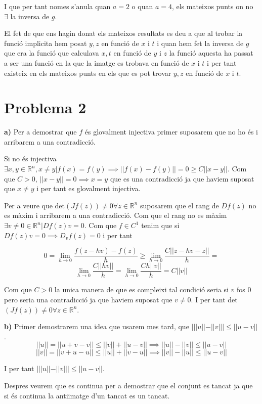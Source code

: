 \documentclass[12pt, a4papre]{article}
\begin{document}
	I que per tant nomes s'anula quan $a=2$ o quan $a=4$, els mateixos punts on no $\exists$ la inversa de $g$.
	
	El fet de que ens hagin donat els mateixos resultats es deu a que al trobar la funció implicita hem posat $y,z$ en funció de $x$ i $t$
	i quan hem fet la inversa de $g$ que era la funció que calculava $x,t$ en funció de $y$ i $z$ la funció aquesta ha passat a ser una funció 
	en la que la imatge es trobava en funció de $x$ i $t$ i per tant existeix en els mateixos punts en els que es pot trovar 
	$y,z$ en funció de $x$ i $t$.
	
	
	\newpage
	\section{Problema 2}
	
	\textbf{a)} Per a demostrar que $f$ és glovalment injectiva primer suposarem que no ho és i arribarem a una contradicció. 
	
	Si no
	és injectiva $\exists x,y \in \mathbb{R}^n, x\ne y | f(x)=f(y) \implies ||f(x)-f(y)||=0\ge C||x-y||$. Com que $C>0$, $||x-y||=0 \implies x=y$ que es
	una contradicció ja que haviem suposat que $x\ne y$ i per tant es glovalment injectiva.
	
	Per a veure que det$(Jf(z))\ne 0 \forall z \in \mathbb{R}^n$ suposarem que el rang de $Df(z)$ no es màxim i arribarem a una contradicció.
	Com que el rang no es màxim $\exists v\ne0 \in \mathbb{R}^n | Df(z)v=0$. Com que $f\in C^1$ tenim que si $Df(z)v=0 \implies D_vf(z)=0$ i per tant
	
	\[
	0=\lim_{h \to 0}\frac{f(z-hv)-f(z)}{h}\geq \lim_{h \to 0}\frac{C||z-hv-z||}{h}=
	\]
	\[
	\lim_{h \to 0}\frac{C||hv||}{h}=\lim_{h \to 0}\frac{Ch||v||}{h}=C||v||
	\]
	
	Com que $C >0$ la unica manera de que es compleixi tal condició seria si $v$ fos 0 pero seria una contradicció ja que haviem suposat que $v\ne0$.
	I per tant det$(Jf(z))\ne 0 \forall z \in \mathbb{R}^n$.
	
	\textbf{b)} Primer demostrarem una idea que usarem mes tard, que $| ||u||-||v|| | \leq ||u-v||$.
	\[
	||u||=||u+v-v||\leq ||v||+||u-v|| \implies ||u||-||v||\leq ||u-v||
	\]
	\[
	||v||=||v+u-u||\leq ||u||+||v-u|| \implies ||v||-||u||\leq ||u-v||
	\]
	
	I per tant $| ||u||-||v|| | \leq ||u-v||$.
	
	Despres veurem que es continua per a demostrar que el conjunt es tancat ja que si és continua la antiimatge d'un tancat es un tancat.
	
\end{document}
